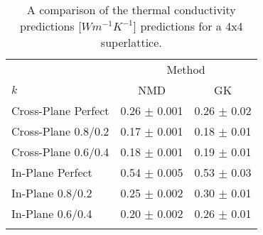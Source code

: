 \begin{table}
\begin{center}
\begin{tabular}{lcc}
\hline\noalign{\smallskip}
&\multicolumn{2}{c}{Method} \\
\cline{2-3}\noalign{\smallskip}
$k$ & NMD  & GK  \\
\noalign{\smallskip}\hline\noalign{\smallskip}
Cross-Plane Perfect  & 0.26 $\pm$ 0.001& 0.26 $\pm$ 0.02\\
Cross-Plane 0.8/0.2    & 0.17  $\pm$ 0.001   &   0.18 $\pm$ 0.01 \\
Cross-Plane 0.6/0.4    & 0.18  $\pm$ 0.001   &   0.19 $\pm$ 0.01 \\
In-Plane Perfect   & 0.54 $\pm$ 0.005 & 0.53 $\pm$ 0.03  \\
In-Plane 0.8/0.2  & 0.25 $\pm$ 0.002 & 0.30 $\pm$ 0.01  \\
In-Plane 0.6/0.4   & 0.20 $\pm$ 0.002 & 0.26 $\pm$ 0.01  \\
\noalign{\smallskip}\hline
\end{tabular}
\end{center}
\renewcommand{\table}{Table.}
\caption{A comparison of the thermal conductivity predictions [$Wm^{-1}K^{-1}$] predictions for a 4x4 superlattice.}
\label{TB:validate}
\end{table}

